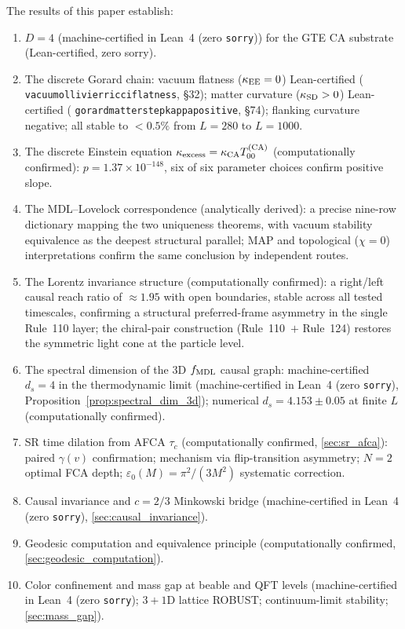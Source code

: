 \documentclass[11pt]{article}
\theoremstyle{remark}
\newcommand{\lean}[1]{%
  \penalty-100
  \begingroup\def\_{\textunderscore\allowbreak}\texttt{#1}\endgroup}
\newcommand{\CatA}{computationally confirmed}
\newcommand{\CatAL}{machine-certified in Lean~4 (zero \texttt{sorry})}
\newcommand{\CatAD}{analytically derived}
\newcommand{\kEE}{\kappa_{\rm EE}}
\newcommand{\kSD}{\kappa_{\rm SD}}
\newcommand{\kCA}{\kappa_{\rm CA}}
\begin{document}
The results of this paper establish:
\begin{enumerate}[leftmargin=2em]
\item $D = 4$ (\CatAL{}) for the GTE CA substrate
(Lean-certified, zero sorry).
\item The discrete Gorard chain: vacuum flatness ($\kEE = 0$) Lean-certified
(\lean{vacuum\_ollivier\_ricci\_flatness}, §32); matter curvature ($\kSD > 0$)
Lean-certified (\lean{gorard\_matter\_step\_kappa\_positive}, §74);
flanking curvature negative; all stable to $< 0.5\%$ from $L = 280$ to $L = 1000$.
\item The discrete Einstein equation $\kappa_{\rm excess} = \kCA
T_{00}^{(\rm CA)}$ (\CatA{}): $p = 1.37 \times 10^{-148}$,
six of six parameter choices confirm positive slope.
\item The MDL--Lovelock correspondence (\CatAD{}): a precise nine-row
dictionary mapping the two uniqueness theorems, with vacuum stability
equivalence as the deepest structural parallel; MAP and topological
($\chi = 0$) interpretations confirm the same conclusion by independent
routes.
\item The Lorentz invariance structure (\CatA{}): a right/left
causal reach ratio of $\approx 1.95$ with open boundaries, stable across
all tested timescales, confirming a structural preferred-frame asymmetry
in the single Rule~110 layer;
the chiral-pair construction (Rule~110~$+$ Rule~124) restores the
symmetric light cone at the particle level.
\item The spectral dimension of the 3D $f_{\rm MDL}$ causal graph:
machine-certified $d_s = 4$ in the thermodynamic limit (\CatAL,
Proposition~\ref{prop:spectral_dim_3d}); numerical $d_s = 4.153 \pm 0.05$
at finite $L$ (\CatA).
\item SR time dilation from AFCA $\tau_c$ (\CatA, \cref{sec:sr_afca}):
paired $\gamma(v)$ confirmation; mechanism via flip-transition asymmetry;
$N = 2$ optimal FCA depth; $\varepsilon_0(M) = \pi^2/(3M^2)$ systematic
correction.
\item Causal invariance and $c = 2/3$ Minkowski bridge (\CatAL,
\cref{sec:causal_invariance}).
\item Geodesic computation and equivalence principle (\CatA,
\cref{sec:geodesic_computation}).
\item Color confinement and mass gap at beable and QFT levels (\CatAL;
$3{+}1$D lattice ROBUST; continuum-limit stability;
\cref{sec:mass_gap}).
\end{enumerate}
\end{document}
